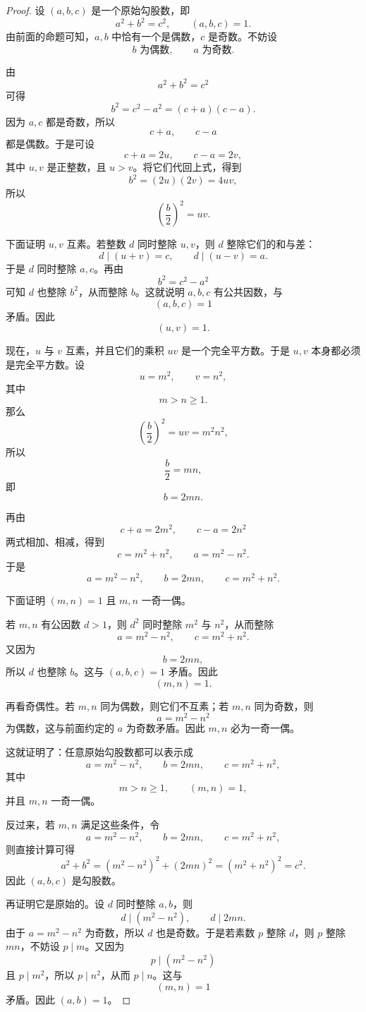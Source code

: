 \documentclass[11pt,a4paper,fontset=fandol]{ctexart}
\theoremstyle{formaltheorem}
\theoremstyle{formalexample}
\begin{document}
\begin{proof}
设 $(a,b,c)$ 是一个原始勾股数，即
\[
a^2+b^2=c^2,
\qquad (a,b,c)=1.
\]
由前面的命题可知，$a,b$ 中恰有一个是偶数，$c$ 是奇数。不妨设
\[
b \text{ 为偶数},\qquad a \text{ 为奇数}.
\]

由
\[
a^2+b^2=c^2
\]
可得
\[
b^2=c^2-a^2=(c+a)(c-a).
\]
因为 $a,c$ 都是奇数，所以
\[
c+a,\qquad c-a
\]
都是偶数。于是可设
\[
c+a=2u,\qquad c-a=2v,
\]
其中 $u,v$ 是正整数，且 $u>v$。将它们代回上式，得到
\[
b^2=(2u)(2v)=4uv,
\]
所以
\[
\left(\frac{b}{2}\right)^2=uv.
\]

下面证明 $u,v$ 互素。若整数 $d$ 同时整除 $u,v$，则 $d$ 整除它们的和与差：
\[
d\mid (u+v)=c,\qquad d\mid (u-v)=a.
\]
于是 $d$ 同时整除 $a,c$。再由
\[
b^2=c^2-a^2
\]
可知 $d$ 也整除 $b^2$，从而整除 $b$。这就说明 $a,b,c$ 有公共因数，与
\[
(a,b,c)=1
\]
矛盾。因此
\[
(u,v)=1.
\]

现在，$u$ 与 $v$ 互素，并且它们的乘积 $uv$ 是一个完全平方数。于是 $u,v$
本身都必须是完全平方数。设
\[
u=m^2,\qquad v=n^2,
\]
其中
\[
m>n\ge 1.
\]
那么
\[
\left(\frac{b}{2}\right)^2=uv=m^2n^2,
\]
所以
\[
\frac{b}{2}=mn,
\]
即
\[
b=2mn.
\]

再由
\[
c+a=2m^2,\qquad c-a=2n^2
\]
两式相加、相减，得到
\[
c=m^2+n^2,\qquad a=m^2-n^2.
\]
于是
\[
a=m^2-n^2,\qquad b=2mn,\qquad c=m^2+n^2.
\]

下面证明 $(m,n)=1$ 且 $m,n$ 一奇一偶。

若 $m,n$ 有公因数 $d>1$，则 $d^2$ 同时整除 $m^2$ 与 $n^2$，从而整除
\[
a=m^2-n^2,\qquad c=m^2+n^2.
\]
又因为
\[
b=2mn,
\]
所以 $d$ 也整除 $b$。这与 $(a,b,c)=1$ 矛盾。因此
\[
(m,n)=1.
\]

再看奇偶性。若 $m,n$ 同为偶数，则它们不互素；若 $m,n$ 同为奇数，则
\[
a=m^2-n^2
\]
为偶数，这与前面约定的 $a$ 为奇数矛盾。因此 $m,n$ 必为一奇一偶。

这就证明了：任意原始勾股数都可以表示成
\[
a=m^2-n^2,\qquad b=2mn,\qquad c=m^2+n^2,
\]
其中
\[
m>n\ge 1,\qquad (m,n)=1,
\]
并且 $m,n$ 一奇一偶。

反过来，若 $m,n$ 满足这些条件，令
\[
a=m^2-n^2,\qquad b=2mn,\qquad c=m^2+n^2,
\]
则直接计算可得
\[
a^2+b^2=(m^2-n^2)^2+(2mn)^2=(m^2+n^2)^2=c^2.
\]
因此 $(a,b,c)$ 是勾股数。

再证明它是原始的。设 $d$ 同时整除 $a,b$，则
\[
d\mid (m^2-n^2),\qquad d\mid 2mn.
\]
由于 $a=m^2-n^2$ 为奇数，所以 $d$ 也是奇数。于是若素数 $p$ 整除 $d$，则
$p$ 整除 $mn$，不妨设 $p\mid m$。又因为
\[
p\mid (m^2-n^2)
\]
且 $p\mid m^2$，所以 $p\mid n^2$，从而 $p\mid n$。这与
\[
(m,n)=1
\]
矛盾。因此 $(a,b)=1$。


\end{proof}
\end{document}
